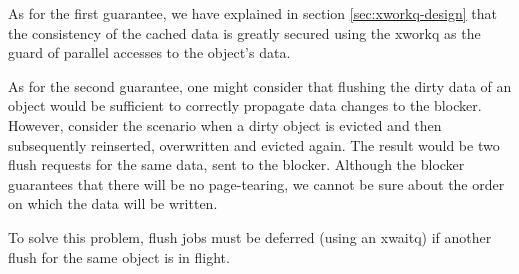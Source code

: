 \begin{comment}
Cache coherence is a concept that is closely connected with concurrency 
control, as is evident in Figure \ref{fig:cached-design.pdf}. It is commonly 
used as a term in the literature on the subject of caches for multiprocessor 
systems or distributed caches and it refers to:

\begin{enumerate}
	\item the consistency of data that are stored in the cache and
	\item how each change is propagated through the system, to the other 
		storage tiers.\label{list:second-coherence}
\end{enumerate}

If we wanted to rephrase the above to match our case, we could say that it 
refers to the consistency of the data that are stored in cached and how each 
change is propagated to the blocker.
\end{comment}

As for the first guarantee, we have explained in section 
\ref{sec:xworkq-design} that the consistency of the cached data is greatly 
secured using the xworkq as the guard of parallel accesses to the object's 
data.

\begin{comment}
The problem is evident if you consider the eviction of an object with dirty 
data. xcache does not operate on object level and thus is unaware of the 
contents of the cache entry. Thus, cached must use the cache entry finalization 
hook to increment the refcount of the object so that it can not be removed 
until all data have been flushed to the blocker. Essentially, cached overrides 
the xcache's book-keeping to maintain cache coherency.
\end{comment}

As for the second guarantee, one might consider that flushing the dirty data of 
an object would be sufficient to correctly propagate data changes to the 
blocker.  However, consider the scenario when a dirty object is evicted and 
then subsequently reinserted, overwritten and evicted again. The result would 
be two flush requests for the same data, sent to the blocker. Although the 
blocker guarantees that there will be no page-tearing, we cannot be sure about 
the order on which the data will be written.

To solve this problem, flush jobs must be deferred (using an xwaitq) if another 
flush for the same object is in flight. 

